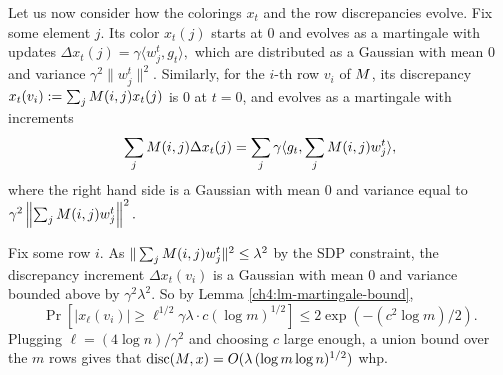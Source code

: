 Let us now consider how the colorings $x_t$ and the row discrepancies evolve.
Fix some element $j$. Its color $x_t(j)$ starts at $0$ and evolves as a martingale with updates 
\(\Delta x_t(j)= \gamma \langle w^t_j,g_t\rangle,\) %
which are distributed as a Gaussian with mean $0$ and variance $\gamma^2 \|w^t_j\|^2$.
Similarly, for the $i$-th row $v_i$ of $M$, its discrepancy $x_t(v_i) := \sum_{j} M(i,j) x_t(j)$ is $0$ at $t=0$, and evolves as a martingale with increments \[\sum_j M(i,j) \Delta x_t(j)  = \sum_{j} \gamma \langle g_t,\sum_j M(i,j) w^t_j \rangle,\]
where the right hand side is a Gaussian with mean $0$ and variance equal to \(\gamma^2 \left\|\sum_j M(i,j) w^t_j\right\|^2.\)

\medskip
{}
 Fix some row $i$. As $\| \sum_j M(i,j) w^t_j\|^2 \leq \lambda^2$ by the SDP constraint, the discrepancy increment  $\Delta x_t(v_i)$ is a Gaussian with mean $0$ and variance bounded above by $\gamma^2 \lambda^2$. 
So 
by Lemma \ref{ch4:lm-martingale-bound}, 
\[
\Pr [ |x_\ell(v_i)| \geq \ell^{1/2}  \gamma \lambda \cdot c (\log m)^{1/2}] \leq  2\exp(-(c^2 \log m)/2).\]
Plugging $\ell = (4 \log n)/\gamma^2$ and choosing $c$ large enough, a union bound over the $m$ rows gives that $\operatorname{disc}(M,x) = O(\lambda\, (\log m \log n)^{1/2})$ whp.



